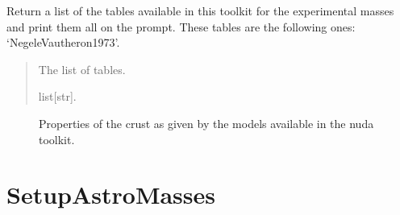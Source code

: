 \documentclass[letterpaper,10pt,english]{sphinxmanual}
\begin{document}

\begin{fulllineitems}
\label{\detokenize{source/api/setup_crust:nucleardatapy.setup_crust.models_crust}}
\pysigstartsignatures
\pysiglinewithargsret
{}
{}
{}
\pysigstopsignatures
\sphinxAtStartPar
Return a list of the tables available in this toolkit for the experimental masses and
print them all on the prompt. These tables are the following
ones: ‘Negele\sphinxhyphen{}Vautheron\sphinxhyphen{}1973’.
\begin{quote}\begin{description}
\sphinxAtStartPar
The list of tables.

\sphinxAtStartPar
list{[}str{]}.

\end{description}\end{quote}

\end{fulllineitems}


\begin{figure}[htbp]
\centering
\capstart

\noindent{}
\caption{Properties of the crust as given by the models available in the nuda toolkit.}\label{\detokenize{source/api/setup_crust:id1}}\end{figure}

\sphinxstepscope


\section{SetupAstroMasses}
\label{\detokenize{source/api/setup_astro_masses:setupastromasses}}\label{\detokenize{source/api/setup_astro_masses::doc}}\label{\detokenize{source/api/setup_astro_masses:module-nucleardatapy.setup_astro_masses}}
\end{document}
